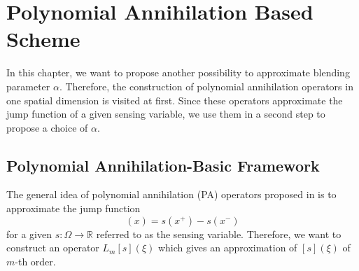 \section{Polynomial Annihilation Based Scheme} \label{se_regul}

In this chapter, we want to propose another possibility to approximate blending parameter $\alpha$. Therefore, the construction of polynomial annihilation operators in one spatial dimension is visited at first. Since these operators approximate the jump function of a given sensing variable, we use them in a second step to propose a choice of $\alpha$.

\subsection{Polynomial Annihilation-Basic Framework}

The general idea of polynomial annihilation (PA) operators proposed in \cite{archibald2005polynomial} is to approximate the jump function
\begin{equation}
 [s](x) = s(x^+)-s(x^-)
\end{equation}
for a given $s:\Omega\rightarrow\mathbb{R}$ referred to as the sensing variable. Therefore, we want to construct an operator $L_m[s](\xi)$ which gives an approximation of $[s](\xi)$ of $m$-th order. 

